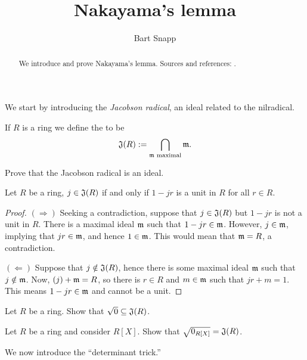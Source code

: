 \documentclass{ximera}
\author{Bart Snapp}
\title{Nakayama's lemma}
\begin{document}
\begin{abstract}
  We introduce and prove Nakayama's lemma. Sources and references:
  \cite{AM1969,jpS2000}.
\end{abstract}
\maketitle

We start by introducing the \textit{Jacobson radical}, an ideal related to the nilradical.

\begin{definition}
  If $R$ is a ring we define the  to be
  \[
  \mathfrak J(R) := \bigcap_{\mathfrak{m} \text{ maximal}}\mathfrak{m}.
  \]
\end{definition}

\begin{exercise}
  Prove that the Jacobson radical is an ideal.
\end{exercise}

\begin{proposition}\label{P:CharJR}
  Let $R$ be a ring, $j\in\mathfrak J(R)$ if and only if $1-jr$ is a unit in
  $R$ for all $r\in R$.
  \begin{proof}
    $(\Rightarrow)$ Seeking a contradiction, suppose that $j\in \mathfrak
    J(R)$ but $1-jr$ is not a unit in $R$. There is a maximal ideal
    $\mathfrak{m}$ such that $1-jr\in\mathfrak{m}$. However, $j\in\mathfrak{m}$, implying that
    $jr\in\mathfrak{m}$, and hence $1\in\mathfrak{m}$. This would mean that $\mathfrak{m} = R$, a
    contradiction.

    $(\Leftarrow)$ Suppose that $j\notin\mathfrak J(R)$, hence there is some
    maximal ideal $\mathfrak{m}$ such that $j\notin\mathfrak{m}$. Now, $(j)+\mathfrak{m} = R$, so
    there is $r\in R$ and $m\in\mathfrak{m}$ such that $jr+m = 1$. This means
    $1-jr\in\mathfrak{m}$ and cannot be a unit.
  \end{proof}
\end{proposition}

\begin{exercise}
  Let $R$ be a ring. Show that $\sqrt{0}\subseteq \mathfrak J(R)$.
\end{exercise}

\begin{exercise}
  Let $R$ be a ring and consider $R[X]$. Show that $\sqrt{0_{R[X]}} =
  \mathfrak J(R)$.
\end{exercise}





We now introduce the ``determinant trick.''
\end{document}
